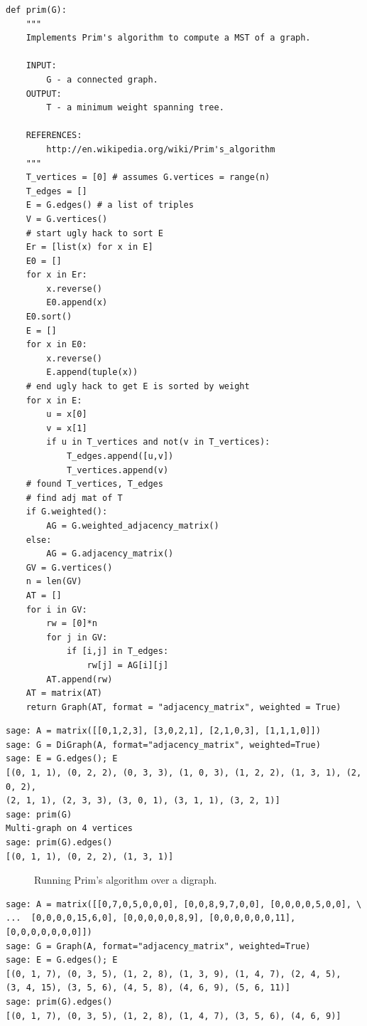\begin{lstlisting}
def prim(G):
    """
    Implements Prim's algorithm to compute a MST of a graph.

    INPUT:
        G - a connected graph.
    OUTPUT:
        T - a minimum weight spanning tree.

    REFERENCES:
        http://en.wikipedia.org/wiki/Prim's_algorithm
    """
    T_vertices = [0] # assumes G.vertices = range(n)
    T_edges = []
    E = G.edges() # a list of triples
    V = G.vertices()
    # start ugly hack to sort E
    Er = [list(x) for x in E]
    E0 = []
    for x in Er:
        x.reverse()
        E0.append(x)
    E0.sort()
    E = []
    for x in E0:
        x.reverse()
        E.append(tuple(x))
    # end ugly hack to get E is sorted by weight
    for x in E:
        u = x[0]
        v = x[1]
        if u in T_vertices and not(v in T_vertices):
            T_edges.append([u,v])
            T_vertices.append(v)
    # found T_vertices, T_edges
    # find adj mat of T
    if G.weighted():
        AG = G.weighted_adjacency_matrix()
    else:
        AG = G.adjacency_matrix()
    GV = G.vertices()
    n = len(GV)
    AT = []
    for i in GV:
        rw = [0]*n
        for j in GV:
            if [i,j] in T_edges:
                rw[j] = AG[i][j]
        AT.append(rw)
    AT = matrix(AT)
    return Graph(AT, format = "adjacency_matrix", weighted = True)
\end{lstlisting}

\begin{lstlisting}
sage: A = matrix([[0,1,2,3], [3,0,2,1], [2,1,0,3], [1,1,1,0]])
sage: G = DiGraph(A, format="adjacency_matrix", weighted=True)
sage: E = G.edges(); E
[(0, 1, 1), (0, 2, 2), (0, 3, 3), (1, 0, 3), (1, 2, 2), (1, 3, 1), (2, 0, 2),
(2, 1, 1), (2, 3, 3), (3, 0, 1), (3, 1, 1), (3, 2, 1)]
sage: prim(G)
Multi-graph on 4 vertices
sage: prim(G).edges()
[(0, 1, 1), (0, 2, 2), (1, 3, 1)]
\end{lstlisting}

\begin{figure}[!htbp]
\centering

\caption{Running Prim's algorithm over a digraph.}
\label{fig:tree_forests:Prim_algorithm_digraph}
\end{figure}

\begin{lstlisting}
sage: A = matrix([[0,7,0,5,0,0,0], [0,0,8,9,7,0,0], [0,0,0,0,5,0,0], \
...  [0,0,0,0,15,6,0], [0,0,0,0,0,8,9], [0,0,0,0,0,0,11], [0,0,0,0,0,0,0]])
sage: G = Graph(A, format="adjacency_matrix", weighted=True)
sage: E = G.edges(); E
[(0, 1, 7), (0, 3, 5), (1, 2, 8), (1, 3, 9), (1, 4, 7), (2, 4, 5),
(3, 4, 15), (3, 5, 6), (4, 5, 8), (4, 6, 9), (5, 6, 11)]
sage: prim(G).edges()
[(0, 1, 7), (0, 3, 5), (1, 2, 8), (1, 4, 7), (3, 5, 6), (4, 6, 9)]
\end{lstlisting}

